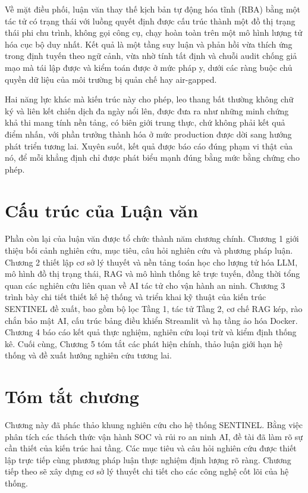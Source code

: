 Về mặt điều phối, luận văn thay thế kịch bản tự động hóa tĩnh (RBA) bằng một tác tử có trạng thái với luồng quyết định được cấu trúc thành một đồ thị trạng thái phi chu trình, không gọi công cụ, chạy hoàn toàn trên một mô hình lượng tử hóa cục bộ duy nhất. Kết quả là một tầng suy luận và phản hồi vừa thích ứng trong định tuyến theo ngữ cảnh, vừa nhờ tính tất định và chuỗi audit chống giả mạo mà tái lập được và kiểm toán được ở mức pháp y, dưới các ràng buộc chủ quyền dữ liệu của môi trường bị quản chế hay air-gapped.

Hai năng lực khác mà kiến trúc này cho phép, leo thang bất thường không chữ ký và liên kết chiến dịch đa ngày nổi lên, được đưa ra như những minh chứng khả thi mang tính nền tảng, có biên giới trung thực, chứ không phải kết quả điểm nhấn, với phần trưởng thành hóa ở mức production được dời sang hướng phát triển tương lai. Xuyên suốt, kết quả được báo cáo đúng phạm vi thật của nó, để mỗi khẳng định chỉ được phát biểu mạnh đúng bằng mức bằng chứng cho phép.

\section{Cấu trúc của Luận văn}
Phần còn lại của luận văn được tổ chức thành năm chương chính. Chương 1 giới thiệu bối cảnh nghiên cứu, mục tiêu, câu hỏi nghiên cứu và phương pháp luận. Chương 2 thiết lập cơ sở lý thuyết và nền tảng toán học cho lượng tử hóa LLM, mô hình đồ thị trạng thái, RAG và mô hình thống kê trực tuyến, đồng thời tổng quan các nghiên cứu liên quan về AI tác tử cho vận hành an ninh. Chương 3 trình bày chi tiết thiết kế hệ thống và triển khai kỹ thuật của kiến trúc SENTINEL đề xuất, bao gồm bộ lọc Tầng 1, tác tử Tầng 2, cơ chế RAG kép, rào chắn bảo mật AI, cấu trúc bảng điều khiển Streamlit và hạ tầng ảo hóa Docker. Chương 4 báo cáo kết quả thực nghiệm, nghiên cứu loại trừ và kiểm định thống kê. Cuối cùng, Chương 5 tóm tắt các phát hiện chính, thảo luận giới hạn hệ thống và đề xuất hướng nghiên cứu tương lai.

\section{Tóm tắt chương}
Chương này đã phác thảo khung nghiên cứu cho hệ thống SENTINEL. Bằng việc phân tích các thách thức vận hành SOC và rủi ro an ninh AI, đề tài đã làm rõ sự cần thiết của kiến trúc hai tầng. Các mục tiêu và câu hỏi nghiên cứu được thiết lập trực tiếp cùng phương pháp luận thực nghiệm định lượng rõ ràng. Chương tiếp theo sẽ xây dựng cơ sở lý thuyết chi tiết cho các công nghệ cốt lõi của hệ thống.
